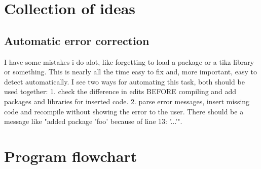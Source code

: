 \documentclass[parskip=half]{scrartcl}
\begin{document}
\section{Collection of ideas}
  \subsection{Automatic error correction}
  I have some mistakes i do alot, like forgetting to load a package or a tikz library or something. This is nearly all the time easy to fix and, more
  important, easy to detect automatically. I see two ways for automating this task, both should be used together: 1. check the difference in edits BEFORE
  compiling and add packages and libraries for inserted code. 2. parse error messages, insert missing code and recompile without showing the error to the
  user. There should be a message like "added package 'foo' because of line 13: '...'".
\section{Program flowchart}
  \begin{center}
  \end{center}
\end{document}
